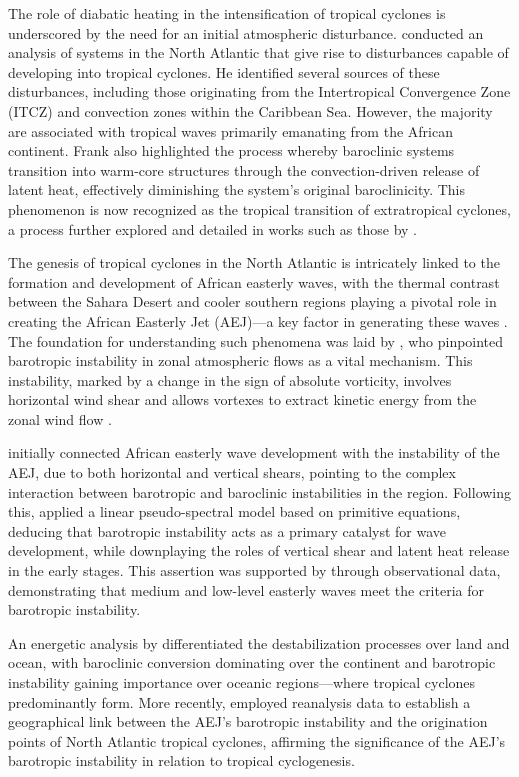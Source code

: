 The role of diabatic heating in the intensification of tropical cyclones is underscored by the need for an initial atmospheric disturbance. \citet{frank1970atlantic} conducted an analysis of systems in the North Atlantic that give rise to disturbances capable of developing into tropical cyclones. He identified several sources of these disturbances, including those originating from the Intertropical Convergence Zone (ITCZ) and convection zones within the Caribbean Sea. However, the majority are associated with tropical waves primarily emanating from the African continent. Frank also highlighted the process whereby baroclinic systems transition into warm-core structures through the convection-driven release of latent heat, effectively diminishing the system's original baroclinicity. This phenomenon is now recognized as the tropical transition of extratropical cyclones, a process further explored and detailed in works such as those by \citet{hart2003cyclone}.


The genesis of tropical cyclones in the North Atlantic is intricately linked to the formation and development of African easterly waves, with the thermal contrast between the Sahara Desert and cooler southern regions playing a pivotal role in creating the African Easterly Jet (AEJ)—a key factor in generating these waves \citep{holton1973introduction}. The foundation for understanding such phenomena was laid by \citet{kuo1949dynamic}, who pinpointed barotropic instability in zonal atmospheric flows as a vital mechanism. This instability, marked by a change in the sign of absolute vorticity, involves horizontal wind shear and allows vortexes to extract kinetic energy from the zonal wind flow \citep{holton1973introduction}.

\citet{burpee1972origin} initially connected African easterly wave development with the instability of the AEJ, due to both horizontal and vertical shears, pointing to the complex interaction between barotropic and baroclinic instabilities in the region. Following this, \citet{rennick1976generation} applied a linear pseudo-spectral model based on primitive equations, deducing that barotropic instability acts as a primary catalyst for wave development, while downplaying the roles of vertical shear and latent heat release in the early stages. This assertion was supported by \citet{reed1977structure} through observational data, demonstrating that medium and low-level easterly waves meet the criteria for barotropic instability.

An energetic analysis by \citet{norquist1977energetics} differentiated the destabilization processes over land and ocean, with baroclinic conversion dominating over the continent and barotropic instability gaining importance over oceanic regions—where tropical cyclones predominantly form. More recently, \citet{wu2012african} employed reanalysis data to establish a geographical link between the AEJ's barotropic instability and the origination points of North Atlantic tropical cyclones, affirming the significance of the AEJ's barotropic instability in relation to tropical cyclogenesis.


